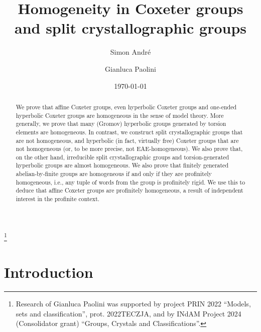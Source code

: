 \documentclass[a4paper, 11pt]{amsart}
\title{Homogeneity in Coxeter groups and split crystallographic groups}
\date{\today}
\author{Simon Andr{\' e}}
\author{Gianluca Paolini}
\theoremstyle{definition}
\theoremstyle{remark}
\begin{document}
\begin{minipage}{\linewidth}


\vspace{0mm}

\begin{abstract}
We prove that affine Coxeter groups, even hyperbolic Coxeter groups and one-ended hyperbolic Coxeter groups are homogeneous in the sense of model theory. More generally, we prove that many (Gromov) hyperbolic groups generated by torsion elements are homogeneous. In contrast, we construct split crystallographic groups that are not homogeneous, and hyperbolic (in fact, virtually free) Coxeter groups that are not homogeneous (or, to be more precise, not $\mathrm{EAE}$-homogeneous). We also prove that, on the other hand, irreducible split crystallographic groups and torsion-generated hyperbolic groups are almost homogeneous. We also prove that finitely generated abelian-by-finite groups are homogeneous if and only if they are profinitely homogeneous, i.e., any tuple of words from the group is profinitely rigid. We use this to deduce that affine Coxeter groups are profinitely homogeneous, a result of independent interest in the profinite context.
\end{abstract}

\thanks{Research of Gianluca Paolini was  supported by project PRIN 2022 ``Models, sets and classification'', prot. 2022TECZJA, and by INdAM Project 2024 (Consolidator grant) ``Groups, Crystals and Classifications''.}
	
\end{minipage}

\maketitle

\tableofcontents

\section{Introduction}

\thispagestyle{empty}

\smallskip
\end{document}
